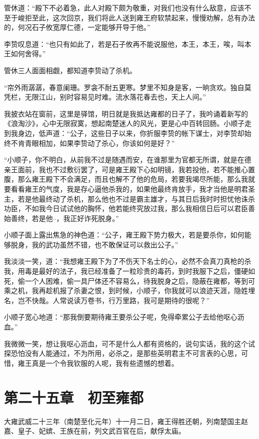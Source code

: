 管休道：“殿下不必着急，此人对殿下颇为敬重，对我们也没有什么敌意，应该不至于峻拒至此，这次回京，我们将此人送到雍王府软禁起来，慢慢劝解，总有办法的，何况石子攸宽厚仁德，一定能够开导于他。”

李贽叹息道：“也只有如此了，若是石子攸再不能说服他，本王，本王，唉，叫本王如何舍得。”

管休三人面面相觑，都知道李贽动了杀机。

“帘外雨潺潺，春意阑珊。罗衾不耐五更寒。梦里不知身是客，一晌贪欢。独自莫凭栏，无限江山，别时容易见时难。流水落花春去也，天上人间。”

我披衣站在窗前，这里是驿馆，明日就是我抵达雍都的日子了，我吟诵着新写的《浪淘沙》，心中无限寂寞，想起南楚迷人的风光，更是心中百转回肠。小顺子走到我身边，低声道：“公子，这些日子以来，你折服李贽的帐下谋士，对李贽却始终不肯青眼相加，如果李贽动了杀心，你该如何是好？”

“小顺子，你不明白，从前我不过是随遇而安，在谁那里为官都无所谓，就是在德亲王面前，我也不过敷衍罢了，可是雍王殿下心如明镜，我若投他，若不能推心置腹，那么雍王殿下不会满足，而且也解不了他的危局，若要我竭尽所能，那么我就要看看雍王的气度，我是存心逼他杀我的，如果他最终肯放手，我才当他是明君圣主，若是他最终动了杀机，那么他也不过是霸主雄才，与其日后我时时担忧他诛杀功臣，不如我今日试试他的胸怀，他若能终究放过我，那么我相信日后可以君臣善始善终，若是他--，我正好诈死脱身。”

小顺子面上露出焦急的神色道：“公子，雍王殿下势力极大，若是要杀你，如何能够脱身，我的武功虽然不错，也不敢保证可以救出公子。”

我淡淡一笑，道：“我想雍王殿下为了不伤天下名士的心，必然不会真刀真枪的杀我，用毒是最好的法子，我已经准备了一粒珍贵的毒药，到时我服下之后，僵硬如死，偷一个人困难，偷一具尸体还不容易么，待我脱身之后，隐蔽在雍都，等到可乘之机，我再趁机报了杀妻之恨，到时候，小顺子，你我就可以浪迹天涯，隐姓埋名，岂不快哉。人常说读万卷书，行万里路，我可是期待的很呢？”

小顺子宽心地道：“那我倒要期待雍王要杀公子呢，免得牵累公子去给他呕心沥血。”

我微微一笑，想让我呕心沥血，可不是什么人都有资格的，说句实话，我的这个试探恐怕没有人能通过，不为所用，必杀之，是那些英明君主不可言表的心思，可惜，雍王真是一个令我钦服的人呢，我有些遗憾的想着。

\chapter{第二十五章　初至雍都}

大雍武威二十三年（南楚至化元年）十一月二日，雍王得胜还朝，列南楚国主赵嘉、皇子、妃嫔、王族在前，列文武百官在后，献俘太庙。

